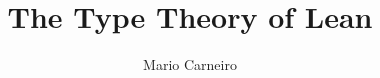 \documentclass[11pt]{article}
\begin{document}
\title{The Type Theory of Lean}
\author{Mario Carneiro}

\maketitle        %

\tableofcontents  %

\pagebreak











\end{document}
